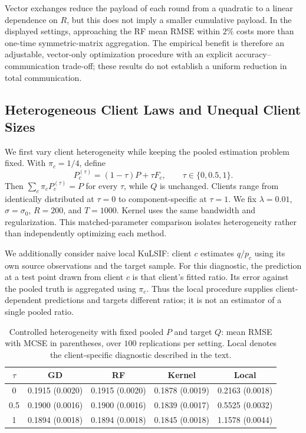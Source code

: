 Vector exchanges reduce the payload of each round from a quadratic to a
linear dependence on $R$, but this does not imply a smaller cumulative
payload. In the displayed settings, approaching the RF mean RMSE within
$2\%$ costs more than one-time symmetric-matrix aggregation. The empirical
benefit is therefore an adjustable, vector-only optimization procedure with
an explicit accuracy--communication trade-off; these results do not establish
a uniform reduction in total communication.

\subsection{Heterogeneous Client Laws and Unequal Client Sizes}
\label{Sec: simulation-heterogeneity}

We first vary client heterogeneity while keeping the pooled estimation
problem fixed. With $\pi_c=1/4$, define
\[
P_c^{(\tau)}=(1-\tau)P+\tau F_c,
\qquad \tau\in\{0,0.5,1\}.
\]
Then $\sum_c\pi_cP_c^{(\tau)}=P$ for every $\tau$, while $Q$ is unchanged.
Clients range from identically distributed at $\tau=0$ to
component-specific at $\tau=1$. We fix $\lambda=0.01$,
$\sigma=\sigma_0$, $R=200$, and $T=1000$. Kernel uses the same bandwidth
and regularization. This matched-parameter comparison isolates
heterogeneity rather than independently optimizing each method.

We additionally consider naive local KuLSIF: client $c$ estimates $q/p_c$
using its own source observations and the target sample. For this diagnostic,
the prediction at a test point drawn from client $c$ is that client's fitted
ratio. Its error against the pooled truth is aggregated using $\pi_c$.
Thus the local procedure supplies client-dependent predictions and targets
different ratios; it is not an estimator of a single pooled ratio.

\begin{table}[htbp]
\centering
\caption{Controlled heterogeneity with fixed pooled $P$ and target $Q$:
mean RMSE with MCSE in parentheses, over $100$ replications per setting.
Local denotes the client-specific diagnostic described in the text.}
\label{tab:simulation-heterogeneity}
\small
\begin{tabular}{ccccc}
\toprule
$\tau$ & GD & RF & Kernel & Local \\
\midrule
0   & 0.1915 (0.0020) & 0.1915 (0.0020) & 0.1878 (0.0019) & 0.2163 (0.0018) \\
0.5 & 0.1900 (0.0016) & 0.1900 (0.0016) & 0.1839 (0.0017) & 0.5525 (0.0032) \\
1   & 0.1894 (0.0018) & 0.1894 (0.0018) & 0.1845 (0.0018) & 1.1578 (0.0044) \\
\bottomrule
\end{tabular}
\end{table}

